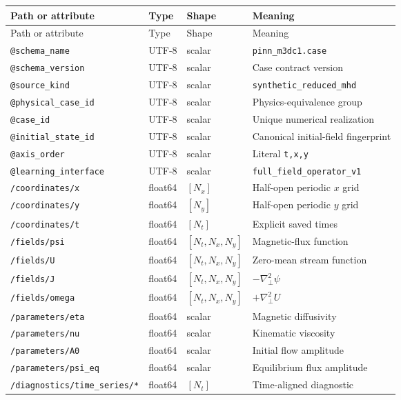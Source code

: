 \documentclass[11pt]{article}
\newcommand{\Lap}{\nabla_{\!\perp}^{2}}
\newcommand{\dataset}[1]{\texttt{/#1}}
\newcommand{\code}[1]{\texttt{#1}}
\begin{document}
\small
\begin{longtable}{p{}p{}p{}p{}}
\toprule
Path or attribute & Type & Shape & Meaning \\
\midrule
\endfirsthead
\toprule
Path or attribute & Type & Shape & Meaning \\
\midrule
\endhead
\code{@schema\_name} & UTF-8 & scalar & \code{pinn\_m3dc1.case} \\
\code{@schema\_version} & UTF-8 & scalar & Case contract version \\
\code{@source\_kind} & UTF-8 & scalar & \code{synthetic\_reduced\_mhd} \\
\code{@physical\_case\_id} & UTF-8 & scalar & Physics-equivalence group \\
\code{@case\_id} & UTF-8 & scalar & Unique numerical realization \\
\code{@initial\_state\_id} & UTF-8 & scalar & Canonical initial-field fingerprint \\
\code{@axis\_order} & UTF-8 & scalar & Literal \code{t,x,y} \\
\code{@learning\_interface} & UTF-8 & scalar & \code{full\_field\_operator\_v1} \\
\dataset{coordinates/x} & float64 & $[N_x]$ & Half-open periodic $x$ grid \\
\dataset{coordinates/y} & float64 & $[N_y]$ & Half-open periodic $y$ grid \\
\dataset{coordinates/t} & float64 & $[N_t]$ & Explicit saved times \\
\dataset{fields/psi} & float64 & $[N_t,N_x,N_y]$ & Magnetic-flux function \\
\dataset{fields/U} & float64 & $[N_t,N_x,N_y]$ & Zero-mean stream function \\
\dataset{fields/J} & float64 & $[N_t,N_x,N_y]$ & $-\Lap\psi$ \\
\dataset{fields/omega} & float64 & $[N_t,N_x,N_y]$ & $+\Lap U$ \\
\dataset{parameters/eta} & float64 & scalar & Magnetic diffusivity \\
\dataset{parameters/nu} & float64 & scalar & Kinematic viscosity \\
\dataset{parameters/A0} & float64 & scalar & Initial flow amplitude \\
\dataset{parameters/psi\_eq} & float64 & scalar & Equilibrium flux amplitude \\
\dataset{diagnostics/time\_series/*} & float64 & $[N_t]$ & Time-aligned diagnostic \\

\end{longtable}
\end{document}
